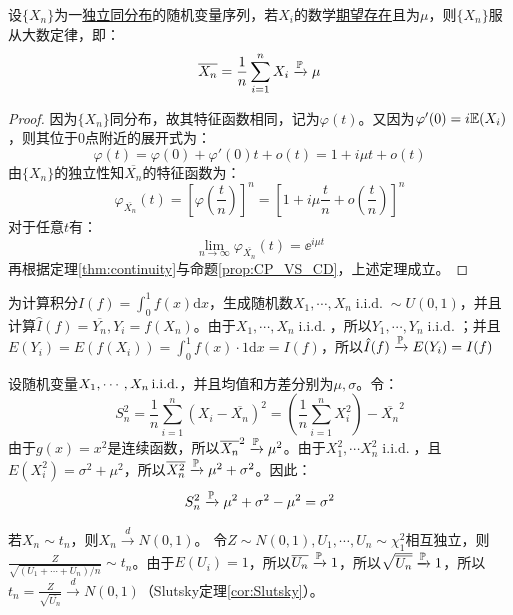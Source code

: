 \begin{theorem}[（辛钦）弱大数定理]
    设$\{ X_n \}$为一\underline{独立同分布}的随机变量序列，若$X_i$的数学\underline{期望存在}且为$\mu$，则$\{ X_n \}$服从大数定律，即：
    \[ \overline{X_n}=\frac1n\sum_{i=1}^n X_i \xrightarrow{\P} \mu \]
\end{theorem}
\begin{proof}
    因为$\{ X_n \}$同分布，故其特征函数相同，记为$\varphi(t)$。又因为$\varphi'(0)=i \E(X_i)$，则其位于$0$点附近的展开式为：
    \[ \varphi(t)=\varphi(0)+\varphi'(0)t+o(t)=1+i \mu t +o(t) \]
    由$\{ X_n \}$的独立性知$\overline{X_n}$的特征函数为：
    \[ \varphi_{\overline{X_n}}(t)=\left[ \varphi(\frac{t}{n}) \right]^n=\left[ 1+i \mu \frac{t}{n} +o(\frac{t}{n}) \right]^n \]
    对于任意$t$有：
    \[ \lim_{n \to \infty} \varphi_{\overline{X_n}}(t) = \ee^{i \mu t}\]
    再根据定理\ref{thm:continuity}与命题\ref{prop:CP_VS_CD}，上述定理成立。
\end{proof}

\begin{example}
    为计算积分$I(f)=\int_0^1 f(x)\mathrm{d}x$，生成随机数$X_1,\cdots ,X_n \operatorname{i.i.d.} \sim U(0,1)$，并且计算$\hat{I}(f)=\overline{Y_n}, Y_i=f(X_n)$。由于$X_1,\cdots ,X_n \operatorname{i.i.d.}$，所以$Y_1,\cdots ,Y_n \operatorname{i.i.d.}$；并且$E(Y_i)=E(f(X_i))=\int_0^1 f(x)\cdot 1\mathrm{d}x=I(f)$，所以$\hat{I}(f)\xrightarrow{\P} E(Y_i)=I(f)$
\end{example}

\begin{example}[样本方差]\label{ex:sample_var}
    设随机变量$X_1,\cdots ,X_n \iid$，并且均值和方差分别为$\mu,\sigma$。令：
    \[ S_n^2=\frac1n\sum_{i=1}^n(X_i-\overline{X_n})^2 =(\frac1n\sum_{i=1}^nX_i^2)-\overline{X_n}^2 \]
    由于$g(x)=x^2$是连续函数，所以$\overline{X_n}^2 \xrightarrow{\P} \mu^2$。由于$X_1^2,\cdots X_n^2 \operatorname{i.i.d.}$，且$E(X_i^2)=\sigma^2+\mu^2$，所以$\overline{X_n^2} \xrightarrow{\P} \mu^2+\sigma^2$。因此：
    \[ S_n^2 \xrightarrow{\P}\mu^2+\sigma^2-\mu^2= \sigma^2 \]
\end{example}

\begin{example}\label{ex:t_disc_to_normal}
    若$X_n \sim t_n$，则$X_n \xrightarrow{d} N(0,1)$。
    令$Z \sim N(0,1),U_1,\cdots ,U_n \sim \chi^2_1$相互独立，则$\frac{Z}{\sqrt{(U_1+\cdots+U_n)/n}} \sim t_n$。由于$E(U_i)=1$，所以$\overline{U_n} \xrightarrow{\P} 1$，所以$\sqrt{\overline{U_n}} \xrightarrow{\P} 1$，所以$t_n=\frac{Z}{\sqrt{\overline{U_n}}} \xrightarrow{d} N(0,1)$（Slutsky定理\ref{cor:Slutsky}）。
\end{example}

